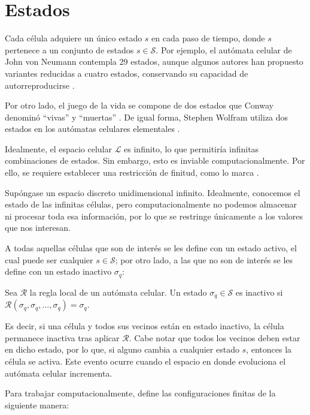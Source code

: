 \section{Estados}

Cada célula adquiere un único estado $s$ en cada paso de tiempo, donde $s$ pertenece a un conjunto de estados $s \in \mathcal{S}$. Por ejemplo, el autómata celular de John von Neumann contempla 29 estados, aunque algunos autores han propuesto variantes reducidas a cuatro estados, conservando su capacidad de autorreproducirse \cite{bhattacharjee2019_ca}. 

Por otro lado, el juego de la vida se compone de dos estados que Conway denominó ``vivas'' y ``muertas'' \cite{lifewiki_life}. De igual forma, Stephen Wolfram utiliza dos estados en los autómatas celulares elementales \cite{Wolfram2002_nks}.

Idealmente, el espacio celular $\mathcal{L}$ es infinito, lo que permitiría infinitas combinaciones de estados. Sin embargo, esto es inviable computacionalmente. Por ello, se requiere establecer una restricción de finitud, como lo marca \cite{bhattacharjee2019_ca}.
 
 Supóngase un espacio discreto unidimensional infinito. Idealmente, conocemos el estado de las infinitas células, pero computacionalmente no podemos almacenar ni procesar toda esa información, por lo que se restringe únicamente a los valores que nos interesan. 
 
 A todas aquellas células que son de interés se les define con un estado activo, el cual puede ser cualquier $s \in \mathcal{S}$; por otro lado, a las que no son de interés se les define con un estado inactivo $\sigma_q$:
 
\begin{definition}
	Sea $\mathcal{R}$ la regla local de un autómata celular. Un estado $\sigma_q \in \mathcal{S}$ es inactivo si $\mathcal{R}(\sigma_q, \sigma_q, \dots, \sigma_q) = \sigma_q$.
	\label{def:estado_inactivo}
\end{definition}

Es decir, si una célula y todos sus vecinos están en estado inactivo, la célula permanece inactiva tras aplicar $\mathcal{R}$. Cabe notar que todos los vecinos deben estar en dicho estado, por lo que, si alguno cambia a cualquier estado $s$, entonces la célula se activa. Este evento ocurre cuando el espacio en donde evoluciona el autómata celular incrementa. 

Para trabajar computacionalmente, \cite{bhattacharjee2019_ca} define las configuraciones finitas de la siguiente manera:

